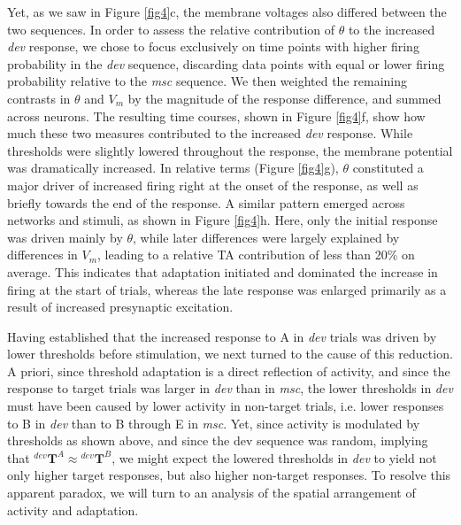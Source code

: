 \documentclass[pdflatex,referee,iicol,sn-basic]{sn-jnl}
\newcommand{\dev}{\textit{dev}}
\newcommand{\msc}{\textit{msc}}
\renewcommand{\T}[3][]{{}^{#1}_{}\mathbf{T}^{#2}_{#3}}
\theoremstyle{thmstyleone}%
\theoremstyle{thmstyletwo}%
\theoremstyle{thmstylethree}%
\begin{document}
Yet, as we saw in Figure \ref{fig4}c, the membrane voltages also differed between the two sequences. In order to assess the relative contribution of $\theta$ to the increased \dev{} response, we chose to focus exclusively on time points with higher firing probability in the \dev{} sequence, discarding data points with equal or lower firing probability relative to the \msc{} sequence. We then weighted the remaining contrasts in $\theta$ and $V_m$ by the magnitude of the response difference, and summed across neurons. The resulting time courses, shown in Figure \ref{fig4}f, show how much these two measures contributed to the increased \dev{} response. While thresholds were slightly lowered throughout the response, the membrane potential was dramatically increased. In relative terms (Figure \ref{fig4}g), $\theta$ constituted a major driver of increased firing right at the onset of the response, as well as briefly towards the end of the response. A similar pattern emerged across networks and stimuli, as shown in Figure \ref{fig4}h. Here, only the initial response was driven mainly by $\theta$, while later differences were largely explained by differences in $V_m$, leading to a relative TA contribution of less than 20\% on average. This indicates that adaptation initiated and dominated the increase in firing at the start of trials, whereas the late response was enlarged primarily as a result of increased presynaptic excitation.

Having established that the increased response to A in \dev{} trials was driven by lower thresholds before stimulation, we next turned to the cause of this reduction. A priori, since threshold adaptation is a direct reflection of activity, and since the response to target trials was larger in \dev{} than in \msc{}, the lower thresholds in \dev{} must have been caused by lower activity in non-target trials, i.e. lower responses to B in \dev{} than to B through E in \msc{}. Yet, since activity is modulated by thresholds as shown above, and since the dev sequence was random, implying that $\T[dev]{A}{} \approx \T[dev]{B}{}$, we might expect the lowered thresholds in \dev{} to yield not only higher target responses, but also higher non-target responses. To resolve this apparent paradox, we will turn to an analysis of the spatial arrangement of activity and adaptation.
\end{document}
